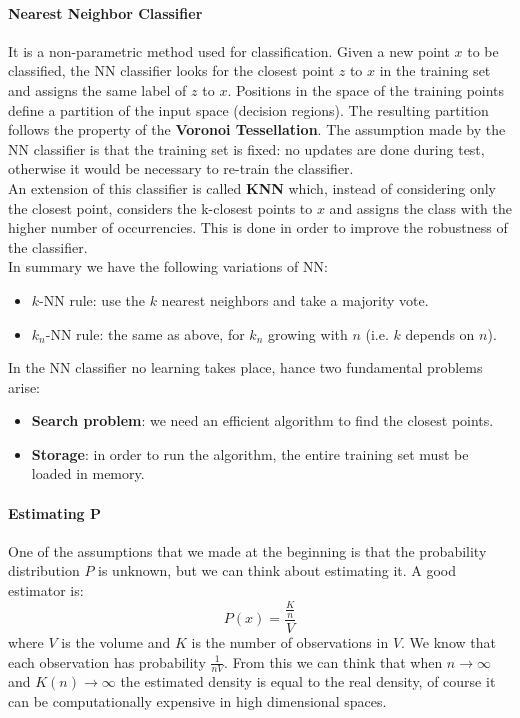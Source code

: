 \paragraph{Nearest Neighbor Classifier} It is a non-parametric method used for classification. Given a new point $x$ to be classified, the NN classifier looks for the closest point $z$ to $x$ in the training set and assigns the same label of $z$ to $x$. Positions in the space of the training points define a partition of the input space (decision regions). The resulting partition follows the property of the \textbf{Voronoi Tessellation}. The assumption made by the NN classifier is that the training set is fixed: no updates are done during test, otherwise it would be necessary to re-train the classifier. \\
An extension of this classifier is called \textbf{KNN} which, instead  of considering only the closest point, considers the k-closest points to $x$ and assigns the class with the higher number of occurrencies. This is done in order to improve the robustness of the classifier.\\
In summary we have the following variations of NN:
\begin{itemize}
	\item $k$-NN rule: use the $k$ nearest neighbors and take a majority vote.
	\item $k_n$-NN rule: the same as above, for $k_n$ growing with $n$ (i.e. $k$ depends on $n$).
\end{itemize}
In the NN classifier no learning takes place, hance two fundamental problems arise:
\begin{itemize}
	\item \textbf{Search problem}: we need an efficient algorithm to find the closest points.
	\item \textbf{Storage}: in order to run the algorithm, the entire training set must be loaded in memory.
\end{itemize}

\paragraph{Estimating P}
One of the assumptions that we made at the beginning is that the probability distribution $P$ is unknown, but we can think about estimating it. A good estimator is:
$$P(x) = \frac{\frac{K}{n}}{V}$$
where $V$ is the volume and $K$  is the number of observations in $V$. We know that each observation has probability $\frac{1}{nV}$. From this we can think that when $n \rightarrow \infty$ and $K(n) \rightarrow \infty$ the estimated density is equal to the real density, of course it can be computationally expensive in high dimensional spaces.

